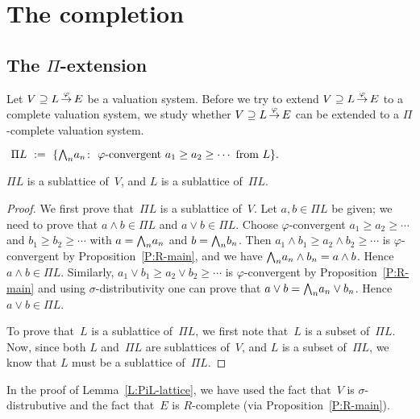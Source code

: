 \documentclass[main.tex]{subfiles}
\begin{document}
\section{The completion}
\label{S:completion}
%
%

\subsection{The $\Pi$-extension}
Let $V \supseteq L\,\smash{\stackrel{\varphi}{\rightarrow}}\,E$ be a valuation system.
Before we try to extend $V \supseteq L\,\smash{\stackrel{\varphi}{\rightarrow}}\,E$ to a complete
valuation system, 
we study whether $V \supseteq L\,\smash{\stackrel{\varphi}{\rightarrow}}\,E$
can be extended to a $\Pi$-complete valuation system.

\begin{dfn}
\label{D:PiL}
$\ \Pi L \ \eqdf \ \{ 
\bw_n a_n \colon \ \text{$\varphi$-convergent }
 a_1\geq a_2 \geq\dotsb \text{ from $L$} \}.$
\end{dfn}
%
%
\begin{lem}
\label{L:PiL-lattice}
$\Pi L$ is a sublattice of~$V$,
and $L$ is a sublattice of~$\Pi L$.
\end{lem}
\begin{proof}
We first prove that~$\Pi L$ is a sublattice of~$V$.
Let $a,b\in \Pi L$ be given;
we need to prove that $a\wedge b \in \Pi L$
and $a \vee b \in \Pi L$.
Choose $\varphi$-convergent 
$a_1 \geq a_2 \geq\dotsb$ and
$b_1 \geq b_2 \geq\dotsb$
with $a = \textstyle{\bigwedge}_n a_n$ and  $b=\textstyle{\bigwedge}_n b_n$.
Then $a_1 \wedge b_1 \geq a_2 \wedge b_2 \geq \dotsb$
is $\varphi$-convergent by Proposition~\ref{P:R-main},
and we have $\textstyle{\bigwedge}_n a_n \wedge b_n = a\wedge b$.
Hence $a\wedge b \in \Pi L$.
Similarly,
$a_1 \vee b_1 \geq a_2 \vee b_2 \geq \dotsb$
is $\varphi$-convergent by Proposition~\ref{P:R-main}
and
using $\sigma$-distributivity 
one can prove that $a \vee b  =\textstyle{\bigwedge}_n a_n \vee b_n$.
Hence $a\vee b \in \Pi L$.

To prove that~$L$ is a sublattice of~$\Pi L$,
we first note that~$L$ is a subset of~$\Pi L$.
Now,
since both $L$ and~$\Pi L$ are sublattices of~$V$,
and $L$ is a subset of~$\Pi L$,
we know that $L$ must be a sublattice of~$\Pi L$.
\end{proof}
\begin{rem}
In the proof of Lemma~\ref{L:PiL-lattice},
we have used the fact that~$V$ is $\sigma$-distrubutive
and the fact that~$E$ is $R$-complete
(via Proposition~\ref{P:R-main}).
\end{rem}
\end{document}

